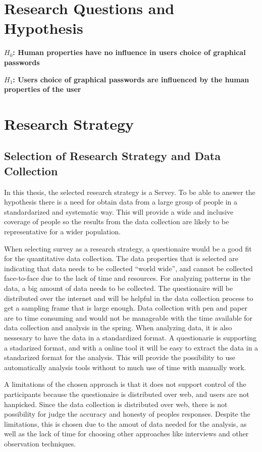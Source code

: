 \section{Research Questions and Hypothesis}
    
  {\bf $H_{0}$: Human properties have no influence in users choice of graphical passwords} 

  {\bf $H_{1}$: Users choice of graphical passwords are influenced by the human properties of the user}

\section{Research Strategy}

  \subsection{Selection of Research Strategy and Data Collection}

    In this thesis, the selected research strategy is a Servey. To be able to answer the hypothesis there is a need for obtain data from a large group of people in a standardarized and systematic way. This will provide a wide and inclusive coverage of people so the results from the data collection are likely to be representative for a wider population. 

    When selecting survey as a research strategy, a questionaire would be a good fit for the quantitative data collection. The data properties that is selected are indicating that data needs to be collected ``world wide'', and cannot be collected face-to-face due to the lack of time and resources. For analyzing patterns in the data, a big amount of data needs to be collected. The questionaire will be distributed over the internet and will be helpful in the data collection process to get a sampling frame that is large enough. Data collection with pen and paper are to time consuming and would not be manageable with the time available for data collection and analysis in the spring. When analyzing data, it is also nessesary to have the data in a standardized format. A questionarie is supporting a stadarized format, and with a online tool it will be easy to extract the data in a standarized format for the analysis. This will provide the possibility to use automatically analysis tools without to much use of time with manually work.

    A limitations of the chosen approach is that it does not support control of the participants because the questionaire is distributed over web, and users are not hanpicked. Since the data collection is distributed over web, there is not possibility for judge the accuracy and honesty of peoples responses. Despite the limitations, this is chosen due to the amout of data needed for the analysis, as well as the lack of time for choosing other approaches like interviews and other observation techniques. 

